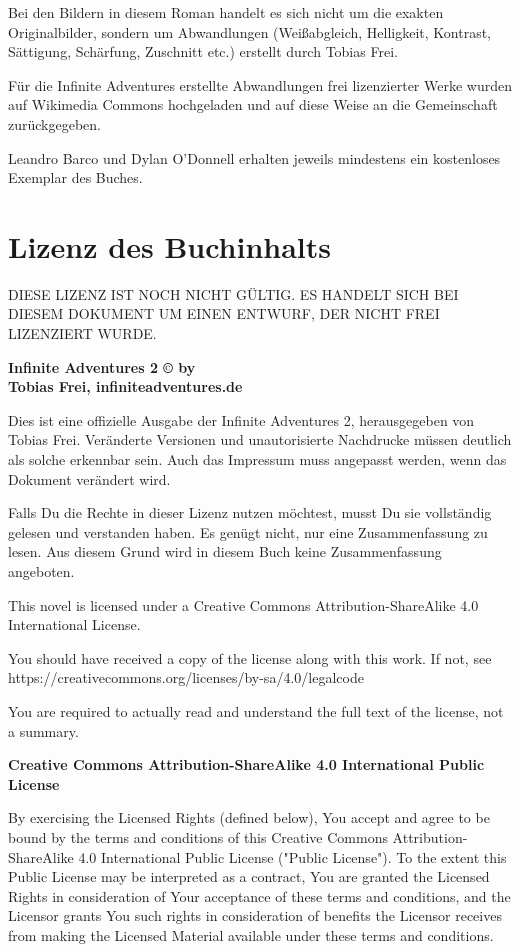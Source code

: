 Bei den Bildern in diesem Roman handelt es sich nicht um die exakten Originalbilder, sondern um Abwandlungen (Weißabgleich, Helligkeit, Kontrast, Sättigung, Schärfung, Zuschnitt etc.) erstellt durch Tobias Frei.

Für die Infinite Adventures erstellte Abwandlungen frei lizenzierter Werke wurden auf Wikimedia Commons hochgeladen und auf diese Weise an die Gemeinschaft zurückgegeben.

Leandro Barco und Dylan O'Donnell erhalten jeweils mindestens ein kostenloses Exemplar des Buches.


\chapter{Lizenz des Buchinhalts}

DIESE LIZENZ IST NOCH NICHT GÜLTIG. ES HANDELT SICH BEI DIESEM DOKUMENT UM EINEN ENTWURF, DER NICHT FREI LIZENZIERT WURDE.

\textbf{Infinite Adventures 2 © by\\ Tobias Frei, infiniteadventures.de}

Dies ist eine offizielle Ausgabe der Infinite Adventures 2, herausgegeben von Tobias Frei. Veränderte Versionen und unautorisierte Nachdrucke müssen deutlich als solche erkennbar sein. Auch das Impressum muss angepasst werden, wenn das Dokument verändert wird.

Falls Du die Rechte in dieser Lizenz nutzen möchtest, musst Du sie vollständig gelesen und verstanden haben. Es genügt nicht, nur eine Zusammenfassung zu lesen. Aus diesem Grund wird in diesem Buch keine Zusammenfassung angeboten.

This novel is licensed under a Creative Commons Attribution-ShareAlike 4.0 International License.

You should have received a copy of the license along with this work. If not, see\\
https://creativecommons.org/licenses/by-sa/4.0/legalcode

You are required to actually read and understand the full text of the license, not a summary.

\begin{center}
    \large{\textbf{Creative Commons Attribution-ShareAlike 4.0 International Public License}}
\end{center}

By exercising the Licensed Rights (defined below), You accept and agree to be bound by the terms and conditions of this Creative Commons Attribution-ShareAlike 4.0 International Public License ("Public License"). To the extent this Public License may be interpreted as a contract, You are granted the Licensed Rights in consideration of Your acceptance of these terms and conditions, and the Licensor grants You such rights in consideration of benefits the Licensor receives from making the Licensed Material available under these terms and conditions.

